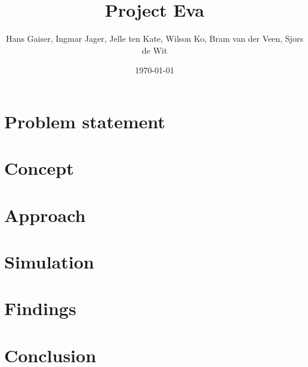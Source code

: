\documentclass[a4paper,10pt,twocolumn]{article}
\begin{document}


\newcommand{\todo}[1]{\textbf{\textsc{\textcolor{red}{[#1]}}}}
\title{Project Eva}
\author{Hans Gaiser, Ingmar Jager, Jelle ten Kate, Wilson Ko, Bram van der Veen, Sjors de Wit}
\date{\today}


\maketitle



\section*{Problem statement}
\label{problem}


\section*{Concept}
\label{concept}


\section*{Approach}
\label{approach}


\section*{Simulation}
\label{simulation}


\section*{Findings}
\label{findings}


\section*{Conclusion}
\label{conclusion}


\newpage

\printbibliography
\end{document}
